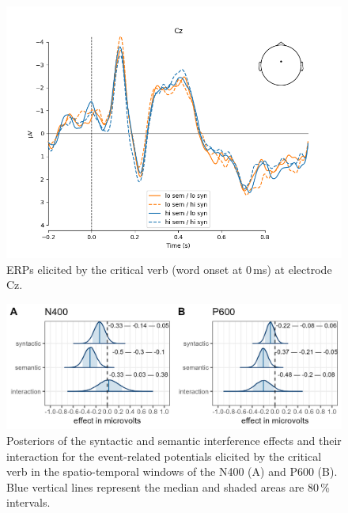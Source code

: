 \documentclass[review,preprint,12pt,authoryear,floatsintext]{elsarticle}
\begin{document}
\begin{figure}[ht]
    \caption{ERPs elicited by the critical verb (word onset at 0\,ms) at electrode Cz.}
    \label{fig:erp_all}
    \centering
    \includegraphics[width=\textwidth]{N_103_Cz_crit.png}
\end{figure}

\begin{figure}[ht]
    \caption{Posteriors of the syntactic and semantic interference effects and their interaction for the event-related potentials elicited by the critical verb in the spatio-temporal windows of the N400 (A) and P600 (B). Blue vertical lines represent the median and shaded areas are 80\,\% intervals.}
    \label{fig:eeg_posteriors}
    \centering
    \includegraphics[width=\textwidth]{posteriors_eeg.jpg}
\end{figure}
\end{document}
